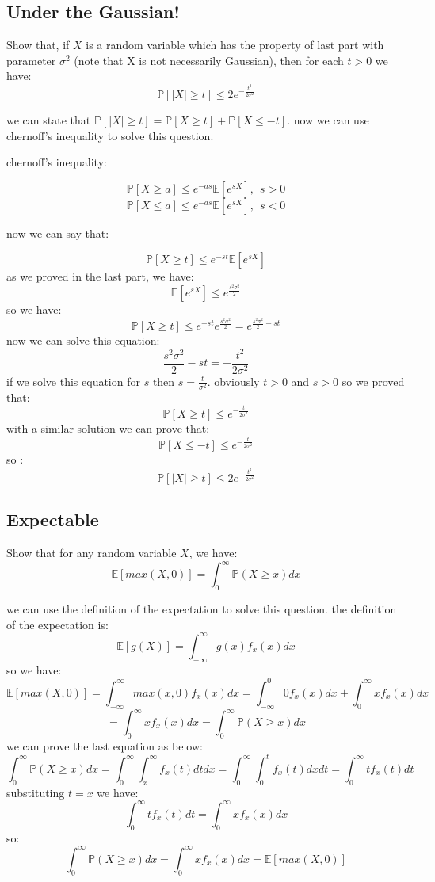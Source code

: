 \subsection{Under the Gaussian!}
Show that, if $X$ is a random variable which has the property of last part with parameter $\sigma ^2$ (note that X is not necessarily Gaussian), then for each $t > 0$ we have:
$$\mathbb{P}[|X| \geq t] \leq 2e^{-\frac{t^2}{2\sigma^2}}$$
\begin{qsolve}
		we can state that $\mathbb{P}[|X| \geq t] = \mathbb{P}[X \geq t] + \mathbb{P}[X \leq -t] $. now we can use chernoff's inequality to solve this question. 
		\begin{qsolve}[]
			\begin{center}
				chernoff's inequality:
			\end{center}
			$$\mathbb{P}[X\geq a] \leq  e^{-as}\mathbb{E}[e^{sX}],\ \  s>0 $$
			$$\mathbb{P}[X\leq a] \leq  e^{-as}\mathbb{E}[e^{sX}],\ \  s<0 $$
		\end{qsolve}
		now we can say that:
		\begin{qsolve}[]
			$$\mathbb{P}[X \geq t] \leq e^{-st}\mathbb{E}[e^{sX}]$$
			as we proved in the last part, we have:
			$$\mathbb{E}[e^{sX}] \leq e^{\frac{s^2\sigma^2}{2}}$$
			so we have:
			$$\mathbb{P}[X \geq t] \leq e^{-st}e^{\frac{s^2\sigma^2}{2}} = e^{\frac{s^2\sigma^2}{2} - st}$$
			\splitqsolve[\splitqsolve]
			now we can solve this equation:
			$$\frac{s^2\sigma^2}{2} - st = -\frac{t^2}{2\sigma^2}$$
			if we solve this equation for $s$ then $s = \frac{t}{\sigma ^2}$. obviously $t > 0$ and $s > 0$ so we proved that:
			$$\mathbb{P}[X \geq t] \leq e^{-\frac{t}{2\sigma ^2}}$$
			with a similar solution we can prove that:
			$$\mathbb{P}[X \leq -t] \leq e^{-\frac{t}{2\sigma ^2}}$$
			so :
			$$\mathbb{P}[|X| \geq t] \leq 2e^{-\frac{t^2}{2\sigma^2}}$$
		\end{qsolve}
\end{qsolve}
\subsection{Expectable}
Show that for any random variable $X$, we have:
$$\mathbb{E}[max(X,0)] = \int_{0}^{\infty} \mathbb{P}(X\geq x) dx$$
\begin{qsolve}
	\begin{qsolve}[]
		we can use the definition of the expectation to solve this question. the definition of the expectation is:
		$$\mathbb{E}[g(X)] = \int_{-\infty}^{\infty} g(x) f_x(x) dx$$
		so we have:
		$$\mathbb{E}[max(X,0)] = \int_{-\infty}^{\infty} max(x,0) f_x(x) dx = \int_{-\infty}^{0} 0 f_x(x) dx + \int_{0}^{\infty} x f_x(x) dx$$
		$$= \int_{0}^{\infty} x f_x(x) dx = \int_{0}^{\infty} \mathbb{P}(X\geq x) dx$$
		we can prove the last equation as below:
		$$\int_{0}^{\infty} \mathbb{P}(X\geq x) dx = \int_{0}^{\infty} \int_{x}^{\infty} f_x(t) dt dx = \int_{0}^{\infty} \int_{0}^{t} f_x(t) dx dt = \int_{0}^{\infty} t f_x(t) dt$$
		substituting $t = x$ we have:
		$$\int_{0}^{\infty} t f_x(t) dt = \int_{0}^{\infty} x f_x(x) dx$$
		\splitqsolve[\splitqsolve]
		so:
		$$\int_{0}^{\infty} \mathbb{P}(X\geq x) dx = \int_{0}^{\infty} x f_x(x) dx = \mathbb{E}[max(X,0)]$$
	\end{qsolve}
\end{qsolve}
